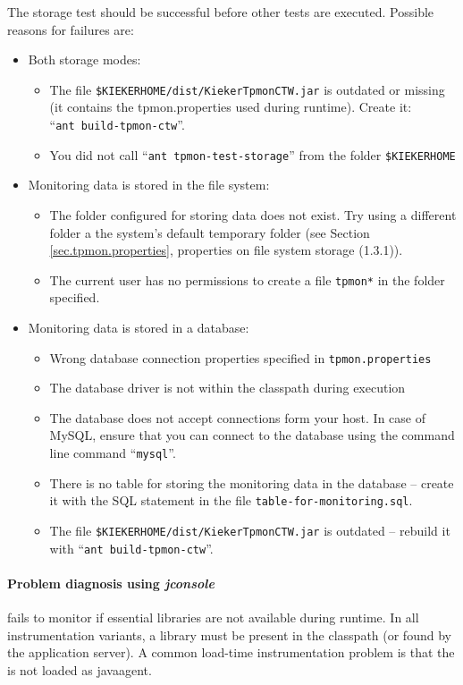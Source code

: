 \documentclass[a4paper,12pt]{scrartcl}
\begin{document}
The storage test should be successful before other \tpmon{} tests are executed. Possible reasons for failures are:
\begin{itemize}
\item Both storage modes:
\begin{itemize}
 \item The file \texttt{\$KIEKERHOME/dist/KiekerTpmonCTW.jar} is outdated or missing (it contains the tpmon.properties used during runtime). Create it: \\ ``\texttt{ant build-tpmon-ctw}''.
\item You did not call ``\texttt{ant tpmon-test-storage}'' from the folder \texttt{\$KIEKERHOME}
\end{itemize}
\item Monitoring data is stored in the file system:
\begin{itemize}
 \item The folder configured for storing data does not exist. Try using a different folder a the system's default temporary folder (see Section \ref{sec.tpmon.properties}, properties on file system storage (1.3.1)).
\item The current user has no permissions to create a file \texttt{tpmon*} in the folder specified.
\end{itemize}
\item Monitoring data is stored in a database:
\begin{itemize}
\item Wrong database connection properties specified in \texttt{tpmon.properties}
\item The database driver is not within the classpath during execution
\item The database does not accept connections form your host. In case of MySQL, ensure that
you can connect to the database using the command line command ``\texttt{mysql}''.
\item There is no table for storing the monitoring data in the database -- create it with the SQL statement in the file
\texttt{table-for-monitoring.sql}.
\item The file \texttt{\$KIEKERHOME/dist/KiekerTpmonCTW.jar} is outdated -- rebuild it with ``\texttt{ant build-tpmon-ctw}''.
\end{itemize}
\end{itemize}

\paragraph{Problem diagnosis using \textit{jconsole}}
\tpmon{} fails to monitor if essential libraries are not available during runtime. In all instrumentation variants, a \tpmon{} library must be present in the classpath (or found by the application server). A common load-time instrumentation problem is that the \aspectjweaverjar{} is not loaded as javaagent.
\end{document}
